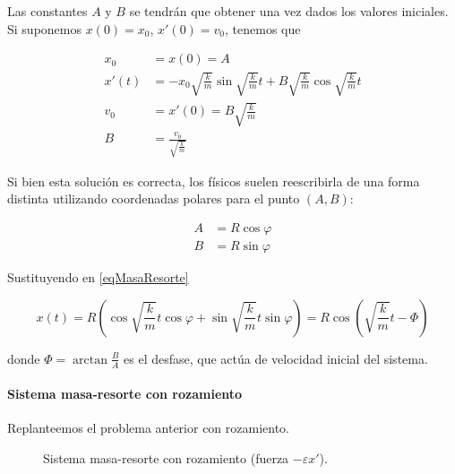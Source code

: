 Las constantes $A$ y $B$ se tendrán que obtener una vez dados los valores iniciales. Si suponemos $x(0) = x_0$, $x'(0) = v_0$, tenemos que

\begin{align*}
x_0 &= x(0) = A \\
x'(t) &= -x_0 \sqrt{\frac{k}{m}} \sin \sqrt{\frac{k}{m}} t + B \sqrt{\frac{k}{m}}\cos\sqrt{\frac{k}{m}} t \\
v_0 &= x'(0) = B \sqrt{\frac{k}{m}} \\
B &= \frac{v_0}{\sqrt{\frac{k}{m}}}
\end{align*}

Si bien esta solución es correcta, los físicos suelen reescribirla de una forma distinta utilizando coordenadas polares para el punto $(A,B)$:

\begin{align*}
A &= R\cos φ \\
B &= R\sin φ
\end{align*}

Sustituyendo en \eqref{eqMasaResorte}

\[ x(t) = R\left(\cos \sqrt{\frac{k}{m}} t\cos φ + \sin \sqrt{\frac{k}{m}} t \sin φ \right) = R\cos\left(\sqrt{\frac{k}{m}}t - Φ\right) \]

donde $Φ = \arctan \frac{B}{A}$ es el desfase, que actúa de velocidad inicial del sistema.

\paragraph{Sistema masa-resorte con rozamiento}

Replanteemos el problema anterior con rozamiento.
\begin{figure}
\centering
{}
\caption{Sistema masa-resorte con rozamiento (fuerza $-εx'$).}
\end{figure}

